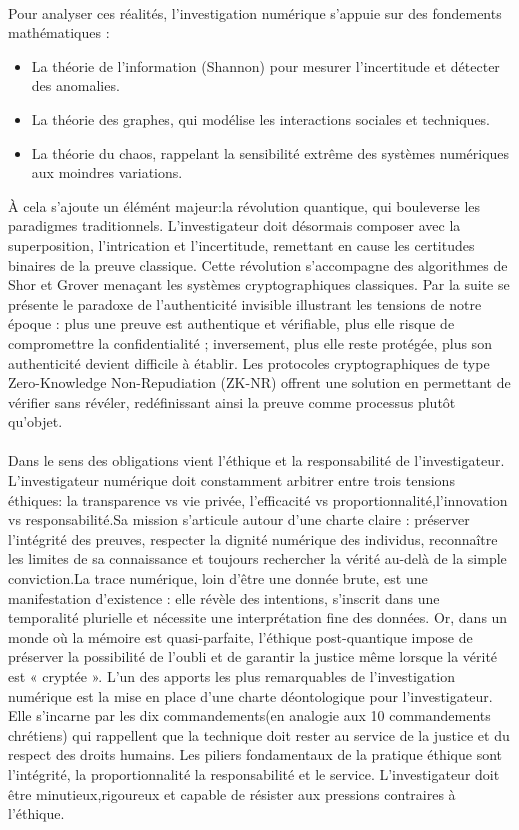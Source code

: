 \documentclass[12pt,a4paper]{article}
\begin{document}
{{\paragraph{}
Pour analyser ces réalités, l’investigation numérique s’appuie sur des fondements mathématiques :
\begin{itemize}
    \item La théorie de l’information (Shannon) pour mesurer l’incertitude et détecter des anomalies.
    \item La théorie des graphes, qui modélise les interactions sociales et techniques.
    \item La théorie du chaos, rappelant la sensibilité extrême des systèmes numériques aux moindres variations.
\end{itemize}
À cela s’ajoute un élémént majeur:la révolution quantique, qui bouleverse les paradigmes traditionnels. L’investigateur doit désormais composer avec la superposition, l’intrication et l’incertitude, remettant en cause les certitudes binaires de la preuve classique. Cette révolution s'accompagne des algorithmes de Shor et Grover menaçant les systèmes cryptographiques classiques. 
Par la suite se présente le paradoxe de l’authenticité invisible illustrant les tensions de notre époque : plus une preuve est authentique et vérifiable, plus elle risque de compromettre la confidentialité ; inversement, plus elle reste protégée, plus son authenticité devient difficile à établir. Les protocoles cryptographiques de type Zero-Knowledge Non-Repudiation (ZK-NR) offrent une solution en permettant de vérifier sans révéler, redéfinissant ainsi la preuve comme processus plutôt qu’objet.

\paragraph{}Dans le sens des obligations vient l'éthique et la responsabilité de l’investigateur. L’investigateur numérique doit constamment arbitrer entre trois tensions éthiques: la transparence vs vie privée, l'efficacité vs proportionnalité,l'innovation vs responsabilité.Sa mission s’articule autour d’une charte claire : préserver l’intégrité des preuves, respecter la dignité numérique des individus, reconnaître les limites de sa connaissance et toujours rechercher la vérité au-delà de la simple conviction.La trace numérique, loin d’être une donnée brute, est une manifestation d’existence : elle révèle des intentions, s’inscrit dans une temporalité plurielle et nécessite une interprétation fine des données. Or, dans un monde où la mémoire est quasi-parfaite, l’éthique post-quantique impose de préserver la possibilité de l’oubli et de garantir la justice même lorsque la vérité est « cryptée ». L'un des apports les plus remarquables de l'investigation numérique est la mise en place d'une charte déontologique pour l'investigateur. Elle s'incarne par les dix commandements(en analogie aux 10 commandements chrétiens) qui rappellent que la technique doit rester au service de la justice et du respect des droits humains. Les piliers fondamentaux de la pratique éthique sont l'intégrité, la proportionnalité la responsabilité et le service. L'investigateur doit être minutieux,rigoureux et capable de résister aux pressions contraires à l'éthique.

}}
\end{document}
